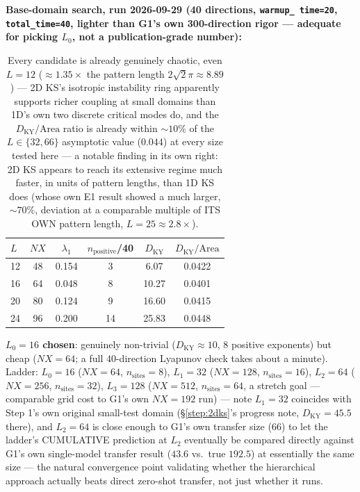\documentclass[11pt]{article}
\begin{document}
\textbf{Base-domain search, run 2026-09-29 (40 directions, \texttt{warmup\_
time=20}, \texttt{total\_time=40}, lighter than G1's own 300-direction
rigor --- adequate for picking $L_0$, not a publication-grade number):}

\begin{table}[h]
\centering
\begin{tabular}{lccccc}
\toprule
$L$ & $NX$ & $\lambda_1$ & $n_{\mathrm{positive}}$/40 & $D_{\mathrm{KY}}$ & $D_{\mathrm{KY}}/\mathrm{Area}$ \\
\midrule
12 & 48 & 0.154 & 3  & 6.07  & 0.0422 \\
16 & 64 & 0.048 & 8  & 10.27 & 0.0401 \\
20 & 80 & 0.124 & 9  & 16.60 & 0.0415 \\
24 & 96 & 0.200 & 14 & 25.83 & 0.0448 \\
\bottomrule
\end{tabular}
\caption{Every candidate is already genuinely chaotic, even $L{=}12$
($\approx1.35\times$ the pattern length $2\sqrt2\pi\approx8.89$) ---
2D KS's isotropic instability ring apparently supports richer coupling
at small domains than 1D's own two discrete critical modes do, and the
$D_{\mathrm{KY}}/\mathrm{Area}$ ratio is already within $\sim10\%$ of the
$L{\in}\{32,66\}$ asymptotic value ($0.044$) at every size tested here
--- a notable finding in its own right: 2D KS appears to reach its
extensive regime much faster, in units of pattern lengths, than 1D KS
does (whose own E1 result showed a much larger, $\sim70\%$, deviation at
a comparable multiple of ITS OWN pattern length, $L{=}25\approx2.8\times$).}
\end{table}

\textbf{$L_0=16$ chosen}: genuinely non-trivial ($D_{\mathrm{KY}}\approx10$,
8 positive exponents) but cheap ($NX{=}64$; a full 40-direction Lyapunov
check takes about a minute). Ladder: $L_0{=}16$ ($NX{=}64$,
$n_{\mathrm{sites}}{=}8$), $L_1{=}32$ ($NX{=}128$, $n_{\mathrm{sites}}{=}16$),
$L_2{=}64$ ($NX{=}256$, $n_{\mathrm{sites}}{=}32$), $L_3{=}128$
($NX{=}512$, $n_{\mathrm{sites}}{=}64$, a stretch goal --- comparable
grid cost to G1's own $NX{=}192$ run) --- note $L_1{=}32$ coincides with
Step 1's own original small-test domain (\S\ref{step:2dks}'s progress
note, $D_{\mathrm{KY}}=45.5$ there), and $L_2{=}64$ is close enough to
G1's own transfer size ($66$) to let the ladder's CUMULATIVE prediction
at $L_2$ eventually be compared directly against G1's own single-model
transfer result ($43.6$ vs.\ true $192.5$) at essentially the same size
--- the natural convergence point validating whether the hierarchical
approach actually beats direct zero-shot transfer, not just whether it
runs.
\end{document}
